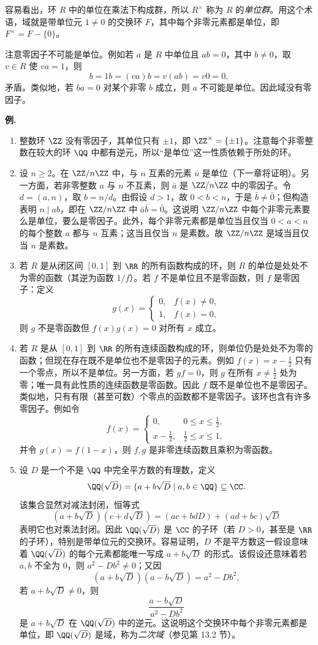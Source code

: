 容易看出，环 $R$ 中的单位在乘法下构成群，所以 $R^\times$ 称为 $R$ 的\emph{单位群}。用这个术语，域就是带单位元 $1\neq0$ 的交换环 $F$，其中每个非零元素都是单位，即 $F^\times=F-\{0\}$。

注意零因子不可能是单位。例如若 $a$ 是 $R$ 中单位且 $ab=0$，其中 $b\neq0$，取 $v\in R$ 使 $va=1$，则
\[
  b=1b=(va)b=v(ab)=v0=0,
\]
矛盾。类似地，若 $ba=0$ 对某个非零 $b$ 成立，则 $a$ 不可能是单位。因此域没有零因子。

\medskip
\noindent\textbf{例.}
\begin{enumerate}[label=(\arabic*)]
  \item 整数环 $\ZZ$ 没有零因子，其单位只有 $\pm1$，即 $\ZZ^\times=\{\pm1\}$。注意每个非零整数在较大的环 $\QQ$ 中都有逆元，所以“是单位”这一性质依赖于所处的环。
  \item 设 $n\geq2$。在 $\ZZ/n\ZZ$ 中，与 $n$ 互素的元素 $\bar u$ 是单位（下一章将证明）。另一方面，若非零整数 $a$ 与 $n$ 不互素，则 $\bar a$ 是 $\ZZ/n\ZZ$ 中的零因子。令 $d=(a,n)$，取 $b=n/d$。由假设 $d>1$，故 $0<b<n$，于是 $\bar b\neq\bar0$；但构造表明 $n\mid ab$，即在 $\ZZ/n\ZZ$ 中 $\bar a\bar b=\bar0$。这说明 $\ZZ/n\ZZ$ 中每个非零元素要么是单位，要么是零因子。此外，每个非零元素都是单位当且仅当 $0<a<n$ 的每个整数 $a$ 都与 $n$ 互素；这当且仅当 $n$ 是素数。故 $\ZZ/n\ZZ$ 是域当且仅当 $n$ 是素数。
  \item 若 $R$ 是从闭区间 $[0,1]$ 到 $\RR$ 的所有函数构成的环，则 $R$ 的单位是处处不为零的函数（其逆为函数 $1/f$）。若 $f$ 不是单位且不是零函数，则 $f$ 是零因子：定义
  \[
    g(x)=\begin{cases}0,& f(x)\neq0,\\ 1,& f(x)=0,
    \end{cases}
  \]
  则 $g$ 不是零函数但 $f(x)g(x)=0$ 对所有 $x$ 成立。
  \item 若 $R$ 是从 $[0,1]$ 到 $\RR$ 的所有连续函数构成的环，则单位仍是处处不为零的函数；但现在存在既不是单位也不是零因子的元素。例如 $f(x)=x-\frac12$ 只有一个零点，所以不是单位。另一方面，若 $gf=0$，则 $g$ 在所有 $x\neq\frac12$ 处为零；唯一具有此性质的连续函数是零函数。因此 $f$ 既不是单位也不是零因子。类似地，只有有限（甚至可数）个零点的函数都不是零因子。该环也含有许多零因子。例如令
  \[
    f(x)=\begin{cases}0,&0\leq x\leq\frac12,\\ x-\frac12,&\frac12\leq x\leq1,
    \end{cases}
  \]
  并令 $g(x)=f(1-x)$，则 $f,g$ 是非零连续函数且乘积为零函数。
  \item 设 $D$ 是一个不是 $\QQ$ 中完全平方数的有理数，定义
  \[
    \QQ(\sqrt D)=\{a+b\sqrt D\mid a,b\in\QQ\}\subseteq\CC.
  \]
  该集合显然对减法封闭，恒等式
  \[
    (a+b\sqrt D)(c+d\sqrt D)=(ac+bdD)+(ad+bc)\sqrt D
  \]
  表明它也对乘法封闭。因此 $\QQ(\sqrt D)$ 是 $\CC$ 的子环（若 $D>0$，甚至是 $\RR$ 的子环），特别是带单位元的交换环。容易证明，$D$ 不是平方数这一假设意味着 $\QQ(\sqrt D)$ 的每个元素都能唯一写成 $a+b\sqrt D$ 的形式。该假设还意味着若 $a,b$ 不全为 $0$，则 $a^2-Db^2\neq0$；又因
  \[
    (a+b\sqrt D)(a-b\sqrt D)=a^2-Db^2,
  \]
  若 $a+b\sqrt D\neq0$，则
  \[
    \frac{a-b\sqrt D}{a^2-Db^2}
  \]
  是 $a+b\sqrt D$ 在 $\QQ(\sqrt D)$ 中的逆元。这说明这个交换环中每个非零元素都是单位，即 $\QQ(\sqrt D)$ 是域，称为\emph{二次域}（参见第 13.2 节）。


\end{enumerate}
